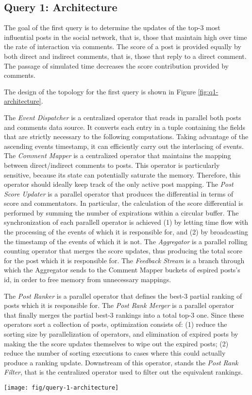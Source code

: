 \subsection{Query 1: Architecture}
\label{sec:solution-q1}

The goal of the first query is to determine the updates of the top-3 most influential posts in the social network, that is, those that maintain high over time the rate of interaction via comments. The score of a post is provided equally by both direct and indirect comments, that is, those that reply to a direct comment. The passage of simulated time decreases the score contribution provided by comments.

The design of the topology for the first query is shown in Figure \ref{fig:q1-architecture}.

The \textit{Event Dispatcher} is a centralized operator that reads in parallel both posts and comments data source. It converts each entry in a tuple containing the fields that are strictly necessary to the following computations. Taking advantage of the ascending events timestamp, it can efficiently carry out the interlacing of events. The \textit{Comment Mapper} is a centralized operator that maintains the mapping between direct/indirect comments to posts. This operator is particularly sensitive, because its state can potentially saturate the memory. Therefore, this operator should ideally keep track of the only active post mapping. 
The \textit{Post Score Updater} is a parallel operator that produces 
the differential in terms of score and commentators. In particular, the calculation of the score differential is performed by summing the number of expirations within a circular buffer. The synchronization of each parallell operator is achieved (1) by letting time flow with the processing of the events of which it is responsible for, and (2) by broadcasting the timestamp of the events of which it is not. The \textit{Aggregator} is a parallel rolling counting operator that merges the score updates, thus producing the total score for the post which it is responsible for. The \textit{Feedback Stream} is a branch through which the Aggregator sends to the Comment Mapper buckets of espired posts's id, in order to free memory from unnecessary mappings.

The \textit{Post Ranker} is a parallel operator that defines the best-3 partial ranking of posts which it is responsible for. The \textit{Post Rank Merger} is a parallel operator that finally merges the partial best-3 rankings into a total top-3 one. Since these operators sort a collection of posts, optimization  consists of: (1) reduce the sorting size by parallelization of operators, and elimination of expired posts by making the the score updates themselves to wipe out the expired posts; (2) reduce the number of sorting executions to cases where this could actually produce a ranking update. Downstream of this operator, stands the \textit{Post Rank Filter}, that is the centralized operator used to filter out the equivalent rankings.

\begin{figure*}[]
	\centering
	\texttt{[image: fig/query-1-architecture]}
	\caption{The topology of operators for Query 1.}
	\label{fig:q1-architecture}
\end{figure*}